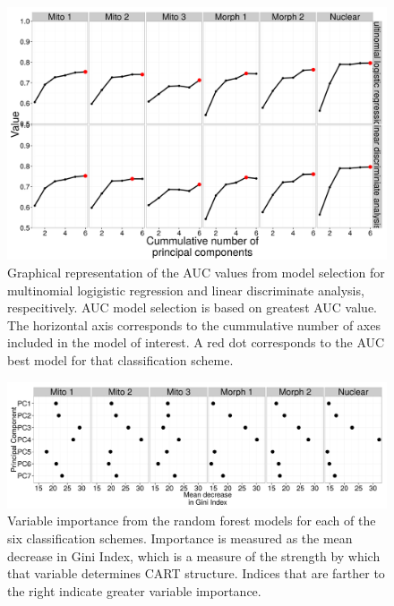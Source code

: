 \documentclass[12pt,letterpaper]{article}
\begin{document}
\begin{figure}[ht]
  \centering
  \includegraphics[height = \textheight, width = \textwidth, keepaspectratio = true]{figure/sel_val}
  \caption{Graphical representation of the AUC values from model selection for multinomial logigistic regression and linear discriminate analysis, respecitively. AUC model selection is based on greatest AUC value. The horizontal axis corresponds to the cummulative number of axes included in the model of interest. A red dot corresponds to the AUC best model for that classification scheme.}
  \label{fig:sel}
\end{figure}

\begin{figure}[ht]
  \centering
  \includegraphics[height = \textheight, width = \textwidth, keepaspectratio = true]{figure/var_imp}
  \caption{Variable importance from the random forest models for each of the six classification schemes. Importance is measured as the mean decrease in Gini Index, which is a measure of the strength by which that variable determines CART structure. Indices that are farther to the right indicate greater variable importance.}
  \label{fig:var_imp}
\end{figure}
\end{document}
